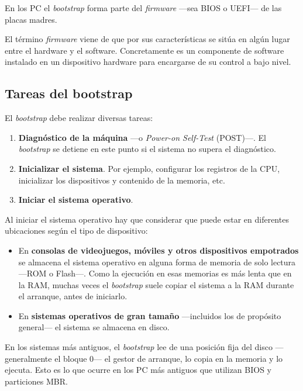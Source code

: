 En los PC el \emph{bootstrap} forma parte del \emph{{}firmware} ---sea
BIOS o UEFI--- de las placas madres.

El término \emph{firmware} viene de que por sus características se sitúa
en algún lugar entre el hardware y el software. Concretamente es un
componente de software instalado en un dispositivo hardware para
encargarse de su control a bajo nivel.

\subsection{Tareas del bootstrap}\label{_tareas_del_bootstrap}

El \emph{bootstrap} debe realizar diversas tareas:

\begin{enumerate}
\def\labelenumi{\arabic{enumi}.}
\item
  \textbf{Diagnóstico de la máquina} ---o \emph{Power-on Self-Test}
  (POST)---. El \emph{bootstrap} se detiene en este punto si el sistema
  no supera el diagnóstico.
\item
  \textbf{Inicializar el sistema}. Por ejemplo, configurar los registros
  de la CPU, inicializar los dispositivos y contenido de la memoria,
  etc.
\item
  \textbf{Iniciar el sistema operativo}.
\end{enumerate}

Al iniciar el sistema operativo hay que considerar que puede estar en
diferentes ubicaciones según el tipo de dispositivo:

\begin{itemize}
\item
  En \textbf{consolas de videojuegos, móviles y otros dispositivos
  empotrados} se almacena el sistema operativo en alguna forma de
  memoria de solo lectura ---ROM o Flash---. Como la ejecución en esas
  memorias es más lenta que en la RAM, muchas veces el \emph{bootstrap}
  suele copiar el sistema a la RAM durante el arranque, antes de
  iniciarlo.
\item
  En \textbf{sistemas operativos de gran tamaño} ---incluidos los de
  propósito general--- el sistema se almacena en disco.
\end{itemize}

En los sistemas más antiguos, el \emph{bootstrap} lee de una posición
fija del disco ---generalmente el bloque 0--- el gestor de arranque, lo
copia en la memoria y lo ejecuta. Esto es lo que ocurre en los PC más
antiguos que utilizan BIOS y particiones MBR.

